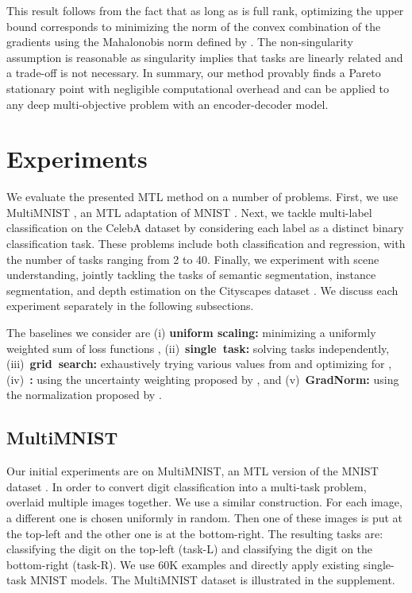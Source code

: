 \documentclass{article}
\begin{document}
This result follows from the fact that as long as  is full rank, optimizing the upper bound corresponds to minimizing the norm of the convex combination of the gradients using the Mahalonobis norm defined by . The non-singularity assumption is reasonable as singularity implies that tasks are linearly related and a trade-off is not necessary. In summary, our method provably finds a Pareto stationary point with negligible computational overhead and can be applied to any deep multi-objective problem with an encoder-decoder model.
 
\section{Experiments}
\label{sec:experiments}


We evaluate the presented MTL method on a number of problems. First, we use MultiMNIST \citep{multi_mnist}, an MTL adaptation of MNIST \citep{mnist}. Next, we tackle multi-label classification on the CelebA dataset \citep{celeba} by considering each label as a distinct binary classification task. These problems include both classification and regression, with the number of tasks ranging from 2 to 40. Finally, we experiment with scene understanding, jointly tackling the tasks of semantic segmentation, instance segmentation, and depth estimation on the Cityscapes dataset \citep{cityscapes}. We discuss each experiment separately in the following subsections.

The baselines we consider are (i) \textbf{uniform scaling:} minimizing a uniformly weighted sum of loss functions \mbox{}, \mbox{(ii) \textbf{single task:}} solving tasks independently, \mbox{(iii) \textbf{grid search:}} exhaustively trying various values from  and optimizing for , \mbox{(iv) \textbf{\citet{Kendall2018}:}} using the uncertainty weighting proposed by \citet{Kendall2018}, and \mbox{(v) \textbf{GradNorm:}} using the normalization proposed by \citet{Chen2018}.



\subsection{MultiMNIST}
\label{sec:multi_mnist_exp}

Our initial experiments are on MultiMNIST, an MTL version of the MNIST dataset \citep{multi_mnist}. In order to convert digit classification into a multi-task problem, \citet{multi_mnist} overlaid multiple images together. We use a similar construction. For each image, a different one is chosen uniformly in random. Then one of these images is put at the top-left and the other one is at the bottom-right. The resulting tasks are: classifying the digit on the top-left (task-L) and classifying the digit on the bottom-right (task-R). We use 60K examples and directly apply existing single-task MNIST models. The MultiMNIST dataset is illustrated in the supplement.
\end{document}
